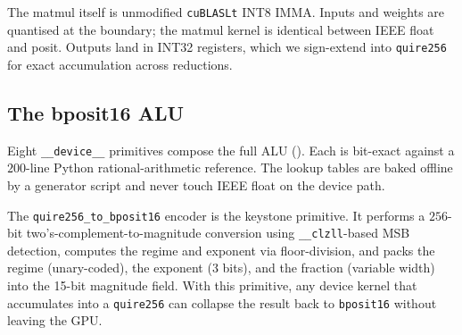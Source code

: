 \documentclass[11pt,a4paper]{article}
\newcommand{\bpsixteen}{\texttt{bposit16}}
\newcommand{\quireTSF}{\texttt{quire256}}
\begin{document}
The matmul itself is unmodified \texttt{cuBLASLt} INT8 IMMA. Inputs and
weights are quantised at the boundary; the matmul kernel is identical
between IEEE float and posit. Outputs land in INT32 registers, which
we sign-extend into \quireTSF{} for exact accumulation across
reductions.

\subsection{The bposit16 ALU}

Eight \texttt{\_\_device\_\_} primitives compose the full ALU
(). Each is bit-exact against a $200$-line Python
rational-arithmetic reference. The lookup tables are baked offline by
a generator script and never touch IEEE float on the device path.

\begin{table}[h]
\centering
{}
\caption{The complete \bpsixteen{} ALU on commodity NVIDIA silicon.
Total LUT footprint $\approx 9.6$ MB --- fits in the 96 MB L2 of
every Blackwell sm\_120 GPU. Tests are bit-exact against the
Python rational-arithmetic reference.}
\label{tab:alu}
\end{table}

The \texttt{quire256\_to\_bposit16} encoder is the keystone primitive.
It performs a $256$-bit two's-complement-to-magnitude conversion using
\texttt{\_\_clzll}-based MSB detection, computes the regime and
exponent via floor-division, and packs the regime (unary-coded), the
exponent (3 bits), and the fraction (variable width) into the 15-bit
magnitude field. With this primitive, any device kernel that
accumulates into a \quireTSF{} can collapse the result back to
\bpsixteen{} without leaving the GPU.
\end{document}
